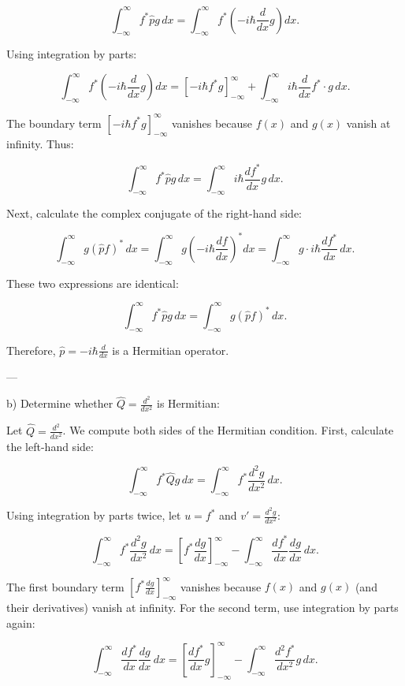 \[
\int_{-\infty}^\infty f^* \hat{p} g \, dx = \int_{-\infty}^\infty f^* \left(-i\hbar \frac{d}{dx} g\right) dx.
\]

Using integration by parts:

\[
\int_{-\infty}^\infty f^* \left(-i\hbar \frac{d}{dx} g\right) dx = \left[ -i\hbar f^* g \right]_{-\infty}^\infty + \int_{-\infty}^\infty i\hbar \frac{d}{dx} f^* \cdot g \, dx.
\]

The boundary term \( \left[ -i\hbar f^* g \right]_{-\infty}^\infty \) vanishes because \( f(x) \) and \( g(x) \) vanish at infinity. Thus:

\[
\int_{-\infty}^\infty f^* \hat{p} g \, dx = \int_{-\infty}^\infty i\hbar \frac{d f^*}{dx} g \, dx.
\]

Next, calculate the complex conjugate of the right-hand side:

\[
\int_{-\infty}^\infty g (\hat{p} f)^* \, dx = \int_{-\infty}^\infty g \left(-i\hbar \frac{df}{dx}\right)^* dx = \int_{-\infty}^\infty g \cdot i\hbar \frac{d f^*}{dx} \, dx.
\]

These two expressions are identical:

\[
\int_{-\infty}^\infty f^* \hat{p} g \, dx = \int_{-\infty}^\infty g (\hat{p} f)^* \, dx.
\]

Therefore, \( \hat{p} = -i\hbar \frac{d}{dx} \) is a Hermitian operator. 

---

b) Determine whether \( \hat{Q} = \frac{d^2}{dx^2} \) is Hermitian:

Let \( \hat{Q} = \frac{d^2}{dx^2} \). We compute both sides of the Hermitian condition. First, calculate the left-hand side:

\[
\int_{-\infty}^\infty f^* \hat{Q} g \, dx = \int_{-\infty}^\infty f^* \frac{d^2 g}{dx^2} \, dx.
\]

Using integration by parts twice, let \( u = f^* \) and \( v' = \frac{d^2 g}{dx^2} \):

\[
\int_{-\infty}^\infty f^* \frac{d^2 g}{dx^2} \, dx = \left[ f^* \frac{dg}{dx} \right]_{-\infty}^\infty - \int_{-\infty}^\infty \frac{d f^*}{dx} \frac{dg}{dx} \, dx.
\]

The first boundary term \( \left[ f^* \frac{dg}{dx} \right]_{-\infty}^\infty \) vanishes because \( f(x) \) and \( g(x) \) (and their derivatives) vanish at infinity. For the second term, use integration by parts again:

\[
\int_{-\infty}^\infty \frac{d f^*}{dx} \frac{dg}{dx} \, dx = \left[ \frac{d f^*}{dx} g \right]_{-\infty}^\infty - \int_{-\infty}^\infty \frac{d^2 f^*}{dx^2} g \, dx.
\]

